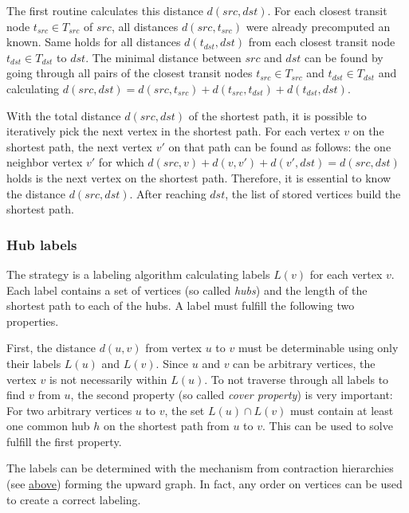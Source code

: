 			The first routine calculates this distance $d(src, dst)$.
			For each closest transit node $t_{src} \in T_{src}$ of $src$, all distances $d(src, t_{src})$ were already precomputed an known.
			Same holds for all distances $d(t_{dst}, dst)$ from each closest transit node $t_{dst} \in T_{dst}$ to $dst$.
			The minimal distance between $src$ and $dst$ can be found by going through all pairs of the closest transit nodes $t_{src} \in T_{src}$ and $t_{dst} \in T_{dst}$ and calculating $d(src, dst) = d(src, t_{src}) + d(t_{src}, t_{dst}) + d(t_{dst}, dst)$.
			
			With the total distance $d(src, dst)$ of the shortest path, it is possible to iteratively pick the next vertex in the shortest path.
			For each vertex $v$ on the shortest path, the next vertex $v'$ on that path can be found as follows:
			the one neighbor vertex $v'$ for which $d(src, v) + d(v, v') + d(v', dst) = d(src, dst)$ holds is the next vertex on the shortest path.
			Therefore, it is essential to know the distance $d(src, dst)$.
			After reaching $dst$, the list of stored vertices build the shortest path.
		
		\subsubsection{Hub labels}
		
			The  strategy \cite{bast-transportation-networks} is a labeling algorithm calculating labels $L(v)$ for each vertex $v$.
			Each label contains a set of vertices (so called \emph{hubs}) and the length of the shortest path to each of the hubs.
			A label must fulfill the following two properties.
			
			First, the distance $d(u, v)$ from vertex $u$ to $v$ must be determinable using only their labels $L(u)$ and $L(v)$.
			Since $u$ and $v$ can be arbitrary vertices, the vertex $v$ is not necessarily within $L(u)$.
			To not traverse through all labels to find $v$ from $u$, the second property (so called \emph{cover property}) is very important:
			For two arbitrary vertices $u$ to $v$, the set $L(u) \cap L(v)$ must contain at least one common hub $h$ on the shortest path from $u$ to $v$.
			This can be used to solve fulfill the first property.
			
			The labels can be determined with the mechanism from contraction hierarchies (see \hyperref[subsubsec:ch]{above}) forming the upward graph.
			In fact, any order on vertices can be used to create a correct labeling.

